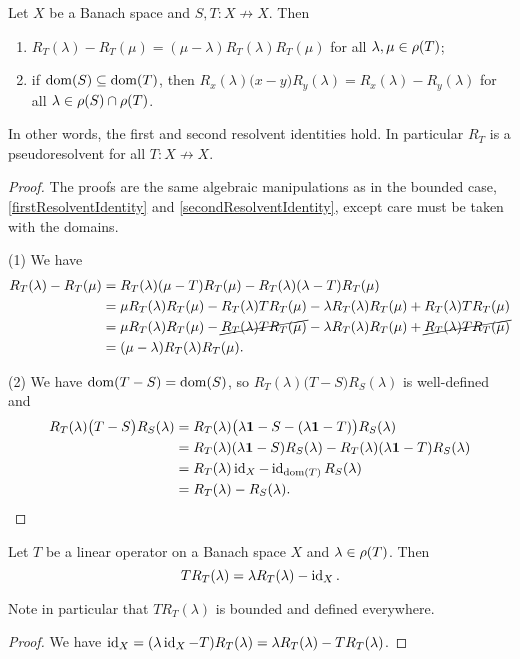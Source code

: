 \begin{proposition}
Let $X$ be a Banach space and $S,T: X\not\to X$. Then
\begin{enumerate}
\item $R_T(\lambda) - R_T(\mu) = (\mu - \lambda)R_T(\lambda)R_T(\mu)$ for all $\lambda, \mu\in \rho(T)$;
\item if $\operatorname{dom}(S)\subseteq \operatorname{dom}(T)$, then $R_x(\lambda)\big(x-y\big)R_y(\lambda) = R_x(\lambda) - R_y(\lambda)$ for all $\lambda\in \rho(S)\cap \rho(T)$.
\end{enumerate}
\end{proposition}
In other words, the first and second resolvent identities hold.
In particular $R_T$ is a pseudoresolvent for all $T:X\not\to X$.
\begin{proof}
The proofs are the same algebraic manipulations as in the bounded case, \ref{firstResolventIdentity} and \ref{secondResolventIdentity}, except care must be taken with the domains.

(1) We have
\begin{align*}
R_T(\lambda) - R_T(\mu) &= R_T(\lambda)(\mu - T)R_T(\mu) - R_T(\lambda)(\lambda - T)R_T(\mu) \\
&= \mu R_T(\lambda)R_T(\mu) - R_T(\lambda)TR_T(\mu) - \lambda R_T(\lambda)R_T(\mu) + R_T(\lambda)TR_T(\mu) \\
&= \mu R_T(\lambda)R_T(\mu) - \cancel{R_T(\lambda)TR_T(\mu)} - \lambda R_T(\lambda)R_T(\mu) + \cancel{R_T(\lambda)TR_T(\mu)} \\
&= (\mu - \lambda)R_T(\lambda)R_T(\mu).
\end{align*}

(2) We have $\operatorname{dom}(T-S) = \operatorname{dom}(S)$, so $R_T(\lambda)\big(T-S\big)R_S(\lambda)$ is well-defined and
\begin{align*}
R_T(\lambda)\big(T-S\big)R_S(\lambda) &= R_T(\lambda)\big(\lambda\boldsymbol{\mathrm{1}}-S - (\lambda\boldsymbol{\mathrm{1}} - T)\big)R_S(\lambda) \\
&= R_T(\lambda)(\lambda\boldsymbol{\mathrm{1}}-S)R_S(\lambda) - R_T(\lambda)(\lambda\boldsymbol{\mathrm{1}} - T)R_S(\lambda) \\
&= R_T(\lambda)\operatorname{id}_{X} - \operatorname{id}_{\operatorname{dom}(T)}R_S(\lambda) \\
&= R_T(\lambda) - R_S(\lambda).
\end{align*}
\end{proof}

\begin{lemma} \label{operatorResolventMultiplication}
Let $T$ be a linear operator on a Banach space $X$ and $\lambda\in\rho(T)$. Then
\[ TR_T(\lambda) = \lambda R_T(\lambda) - \operatorname{id}_X. \]
\end{lemma}
Note in particular that $TR_T(\lambda)$ is bounded and defined everywhere.
\begin{proof}
We have $\operatorname{id}_X = (\lambda \operatorname{id}_X - T)R_T(\lambda) = \lambda R_T(\lambda) - TR_T(\lambda)$.
\end{proof}

